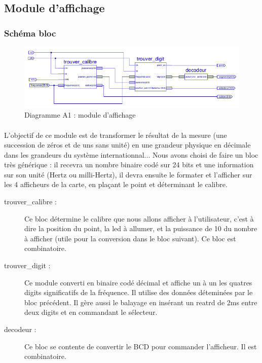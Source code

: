 \documentclass[a4paper,11pt]{article}
\begin{document}
\subsection{Module d'affichage}
  \subsubsection{Schéma bloc}
  
  \begin{figure}[H]
\begin{center}
	\includegraphics[scale=.9]{sch-afficheur.png}
	\caption{Diagramme A1 : module d'affichage}
\end{center}
\end{figure}

\paragraph{} L'objectif de ce module est de transformer le résultat de la mesure (une succession de zéros et de uns sans unité) 
en une grandeur physique en décimale dans les grandeurs du système internationnal... Nous avons choisi de faire un bloc très générique : 
il recevra un nombre binaire codé sur 24 bits et une information sur son unité (Hertz ou milli-Hertz), il devra ensuite le formater 
et l'afficher sur les 4 afficheurs de la carte, en plaçant le point et déterminant le calibre.

\begin{description}
  \item[trouver\_calibre : ] Ce bloc détermine le calibre que nous allons afficher à l'utilisateur, c'est à dire la position du point, la
  led à allumer, et la puissance de 10 du nombre à afficher (utile pour la conversion dans le bloc suivant). Ce bloc est combinatoire.
  \item[trouver\_digit : ] Ce module converti en binaire codé décimal et affiche un à un les quatres digits significatifs de la fréquence. 
  Il utilise des données déteminées par le bloc précédent. Il gère aussi le balayage en insérant un reatrd de 2ms entre deux digits et 
  en commandant le sélecteur.
  \item[decodeur : ] Ce bloc se contente de convertir le BCD pour commander l'afficheur. Il est combinatoire.
\end{description}
\end{document}
